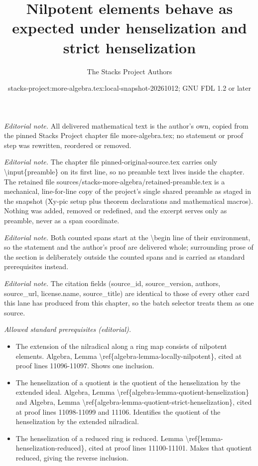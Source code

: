 \documentclass[10pt,a4paper]{amsart}
\title{Nilpotent elements behave as expected under henselization and strict henselization}
\author{The Stacks Project Authors}
\date{stacks-project:more-algebra.tex:local-snapshot-20261012; GNU FDL 1.2 or later}
\theoremstyle{plain}
\theoremstyle{definition}
\theoremstyle{remark}
\numberwithin{equation}{subsection}
\begin{document}
\maketitle
\setcounter{subsection}{1}
\noindent\textit{Editorial note.} All delivered mathematical text is the author's own, copied from the pinned Stacks Project chapter file more-algebra.tex; no statement or proof step was rewritten, reordered or removed.\par\medskip
\noindent\textit{Editorial note.} The chapter file pinned-original-source.tex carries only \textbackslash{}input\{preamble\} on its first line, so no preamble text lives inside the chapter. The retained file sources/stacks-more-algebra/retained-preamble.tex is a mechanical, line-for-line copy of the project's single shared preamble as staged in the snapshot (Xy-pic setup plus theorem declarations and mathematical macros). Nothing was added, removed or redefined, and the excerpt serves only as preamble, never as a span coordinate.\par\medskip
\noindent\textit{Editorial note.} Both counted spans start at the \textbackslash{}begin line of their environment, so the statement and the author's proof are delivered whole; surrounding prose of the section is deliberately outside the counted spans and is carried as standard prerequisites instead.\par\medskip
\noindent\textit{Editorial note.} The citation fields (source\_id, source\_version, authors, source\_url, license.name, source\_title) are identical to those of every other card this lane has produced from this chapter, so the batch selector treats them as one source.\par\medskip
\noindent\textit{Allowed standard prerequisites (editorial).}\begin{itemize}
\item The extension of the nilradical along a ring map consists of nilpotent elements. Algebra, Lemma \textbackslash{}ref\{algebra-lemma-locally-nilpotent\}, cited at proof lines 11096-11097. Shows one inclusion.
\item The henselization of a quotient is the quotient of the henselization by the extended ideal. Algebra, Lemma \textbackslash{}ref\{algebra-lemma-quotient-henselization\} and Algebra, Lemma \textbackslash{}ref\{algebra-lemma-quotient-strict-henselization\}, cited at proof lines 11098-11099 and 11106. Identifies the quotient of the henselization by the extended nilradical.
\item The henselization of a reduced ring is reduced. Lemma \textbackslash{}ref\{lemma-henselization-reduced\}, cited at proof lines 11100-11101. Makes that quotient reduced, giving the reverse inclusion.
\end{itemize}\medskip
\end{document}
